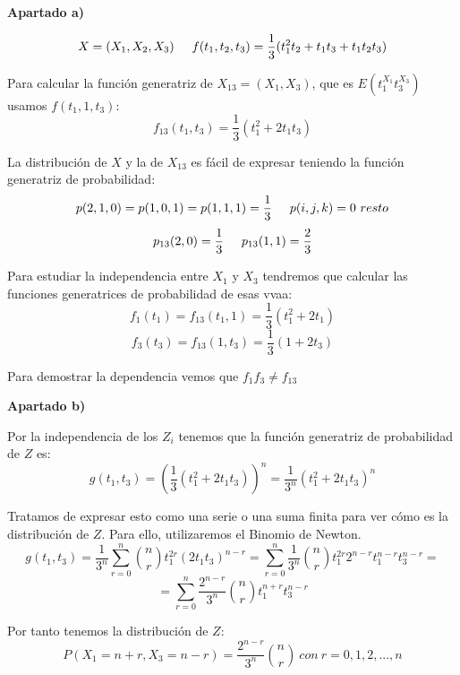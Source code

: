 \documentclass[openany]{book}
\begin{document}
\begin{exercise}

    \begin{flushright}
        \textbf{Apartado a)}
    \end{flushright}

    $$ X = (X_1,X_2,X_3) \hspace{5mm} f(t_1,t_2,t_3) = \dfrac{1}{3}(t_1^2t_2+t_1t_3+t_1t_2t_3) $$
    
    Para calcular la función generatriz de $ X_{13} = (X_1,X_3) $, que es $ E(t_1^{X_1}t_3^{X_3}) $ usamos $ f(t_1,1,t_3) $:
    $$ f_{13}(t_1,t_3) = \dfrac{1}{3}(t_1^2+2t_1t_3) $$

    La distribución de $ X $ y la de $ X_{13} $ es fácil de expresar teniendo la función generatriz de probabilidad:
    $$ p(2,1,0) = p(1,0,1) = p(1,1,1) = \dfrac{1}{3} \hspace{5mm} p(i,j,k) = 0\ resto $$
    $$ p_{13}(2,0) = \dfrac{1}{3} \hspace{5mm} p_{13}(1,1) = \dfrac{2}{3} $$

    Para estudiar la independencia entre $ X_1 $ y $ X_3 $ tendremos que calcular las funciones generatrices de probabilidad de esas vvaa:
    $$ f_{1}(t_1) = f_{13}(t_1,1) = \dfrac{1}{3}(t_1^2+2t_1) $$
    $$ f_{3}(t_3) = f_{13}(1,t_3) = \dfrac{1}{3}(1+2t_3) $$

    Para demostrar la dependencia vemos que $ f_{1}f_{3} \ne f_{13} $

\begin{flushright}
    \textbf{Apartado b)}
\end{flushright}

    Por la independencia de los $ Z_i $ tenemos que la función generatriz de probabilidad de $ Z $ es:
    $$ g(t_1,t_3) = (\dfrac{1}{3}(t_1^2+2t_1t_3))^{n} = \dfrac{1}{3^{n}}(t_1^2+2t_1t_3)^{n} $$

    Tratamos de expresar esto como una serie o una suma finita para ver cómo es la distribución de $ Z $. Para ello, utilizaremos el Binomio de Newton.
    $$ g(t_1,t_3) =\dfrac{1}{3^{n}} \sum\limits_{r=0}^{n} \binom{n}{r} t_1^{2r}(2t_1t_3)^{n-r} = \sum\limits_{r=0}^{n} \dfrac{1}{3^{n}} \binom{n}{r} t_1^{2r}2^{n-r}t_1^{n-r}t_3^{n-r} = $$
    $$ = \sum\limits_{r=0}^{n} \dfrac{2^{n-r}}{3^{n}} \binom{n}{r} t_1^{n+r}t_3^{n-r} $$

    Por tanto tenemos la distribución de $ Z $:
    $$ P(X_1 = n+r,X_3 = n-r) = \dfrac{2^{n-r}}{3^{n}} \binom{n}{r} \ con \ r = 0,1,2,...,n $$


\end{exercise}
\end{document}

